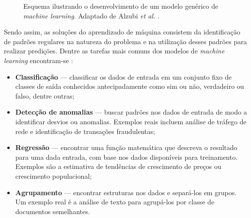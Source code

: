 \documentclass[
	12pt,				%
	openright,			%
	oneside,			%
	a4paper,			%
	tccpreliminar,			%
	]{ABNT-DC-UEL}
\begin{document}
\begin{figure}[htb]
    \centering
    \caption{Esquema ilustrando o desenvolvimento de um modelo genérico de \textit{machine learning}. Adaptado de Alzubi \textit{et al.} \cite{alzubi:18}.}
    \label{fig:ml-esquema}
\end{figure}

Sendo assim, as soluções do aprendizado de máquina consistem da identificação de padrões regulares na natureza do problema e na utilização desses padrões para realizar predições. Dentre as tarefas mais comuns dos modelos de \textit{machine learning} encontram-se \cite{alzubi:18}:

\begin{itemize}
    \item \textbf{Classificação} --- classificar os dados de entrada em um conjunto fixo de classes de saída conhecidos antecipadamente como sim ou não, verdadeiro ou falso, dentre outras;
    \item \textbf{Detecção de anomalias} --- buscar padrões nos dados de entrada de modo a identificar desvios ou anomalias. Exemplos reais incluem análise de tráfego de rede e identificação de transações fraudulentas;
    \item \textbf{Regressão} --- encontrar uma função matemática que descreva o resultado para uma dada entrada, com base nos dados disponíveis para treinamento. Exemplos são a estimativa de tendências de crescimento de preços ou crescimento populacional;
    \item \textbf{Agrupamento} --- encontrar estruturas nos dados e separá-los em grupos. Um exemplo real é a análise de texto para agrupá-los por classe de documentos semelhantes.
\end{itemize}
\end{document}
